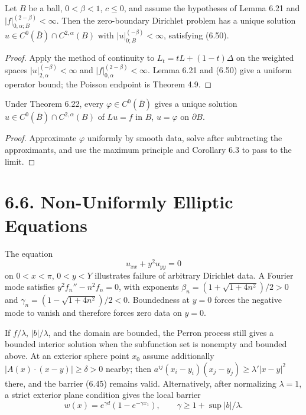 \begin{theorem}
\label{gt-ch06-thm-6-22}
Let $B$ be a ball, $0<\beta<1$, $c\le0$, and assume the hypotheses of Lemma
6.21 and $|f|_{0,\alpha;B}^{(2-\beta)}<\infty$.  Then the zero-boundary
Dirichlet problem has a unique solution
$u\in C^0(\bar B)\cap C^{2,\alpha}(B)$ with
$|u|_{0;B}^{(-\beta)}<\infty$, satisfying (6.50).
\end{theorem}
\begin{proof}
\sketch Apply the method of continuity to $L_t=tL+(1-t)\Delta$ on the weighted
spaces $|u|_{2,\alpha}^{(-\beta)}<\infty$ and
$|f|_{0,\alpha}^{(2-\beta)}<\infty$.  Lemma 6.21 and (6.50) give a uniform
operator bound; the Poisson endpoint is Theorem 4.9.
\end{proof}

\begin{corollary}
\label{gt-ch06-cor-6-23}
Under Theorem 6.22, every $\varphi\in C^0(\bar B)$ gives a unique solution
$u\in C^0(\bar B)\cap C^{2,\alpha}(B)$ of $Lu=f$ in $B$, $u=\varphi$ on
$\partial B$.
\end{corollary}
\begin{proof}
\sketch Approximate $\varphi$ uniformly by smooth data, solve after subtracting
the approximants, and use the maximum principle and Corollary 6.3 to pass to
the limit.
\end{proof}

\section*{6.6. Non-Uniformly Elliptic Equations}

The equation
\begin{equation}\tag{6.54}
u_{xx}+y^2u_{yy}=0
\end{equation}
on $0<x<\pi$, $0<y<Y$ illustrates failure of arbitrary Dirichlet data.  A
Fourier mode satisfies $y^2f_n''-n^2f_n=0$, with exponents
$\beta_n=(1+\sqrt{1+4n^2})/2>0$ and
$\gamma_n=(1-\sqrt{1+4n^2})/2<0$.  Boundedness at $y=0$ forces the negative
mode to vanish and therefore forces zero data on $y=0$.

If $f/\lambda$, $|b|/\lambda$, and the domain are bounded, the Perron process
still gives a bounded interior solution when the subfunction set is nonempty
and bounded above.  At an exterior sphere point $x_0$ assume additionally
$|A(x)\cdot(x-y)|\ge\delta>0$ nearby; then
$a^{ij}(x_i-y_i)(x_j-y_j)\ge\lambda'|x-y|^2$ there, and the barrier (6.45)
remains valid.  Alternatively, after normalizing $\lambda=1$, a strict
exterior plane condition gives the local barrier
\[
w(x)=e^{\gamma d}(1-e^{-\gamma x_1}),\qquad \gamma\ge1+\sup|b|/\lambda.
\]

